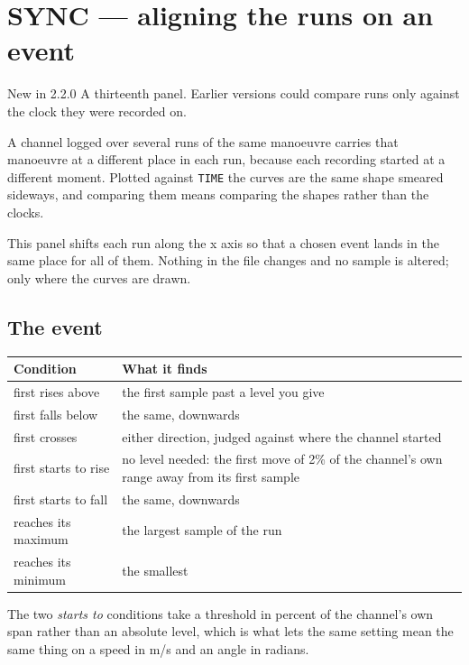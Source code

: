 \documentclass[11pt,a4paper,oneside]{report}
\newcommand{\code}[1]{\texttt{#1}}
\begin{document}
\section{SYNC --- aligning the runs on an event}
\label{sec:sync}

\begin{aoenew}{New in 2.2.0}
A thirteenth panel. Earlier versions could compare runs only against the clock
they were recorded on.
\end{aoenew}

A channel logged over several runs of the same manoeuvre carries that manoeuvre
at a different place in each run, because each recording started at a different
moment. Plotted against \code{TIME} the curves are the same shape smeared
sideways, and comparing them means comparing the shapes rather than the clocks.

This panel shifts each run along the x axis so that a chosen event lands in the
same place for all of them. Nothing in the file changes and no sample is
altered; only where the curves are drawn.

\subsection*{The event}

\begin{longtable}{@{}p{}p{}@{}}
\toprule
\textbf{Condition} & \textbf{What it finds} \\
\midrule
\endhead
first rises above & the first sample past a level you give \\
first falls below & the same, downwards \\
first crosses & either direction, judged against where the channel started \\
first starts to rise & no level needed: the first move of 2\% of the channel's
own range away from its first sample \\
first starts to fall & the same, downwards \\
reaches its maximum & the largest sample of the run \\
reaches its minimum & the smallest \\
\bottomrule
\end{longtable}

The two \emph{starts to} conditions take a threshold in percent of the
channel's own span rather than an absolute level, which is what lets the same
setting mean the same thing on a speed in m/s and an angle in radians.
\end{document}
